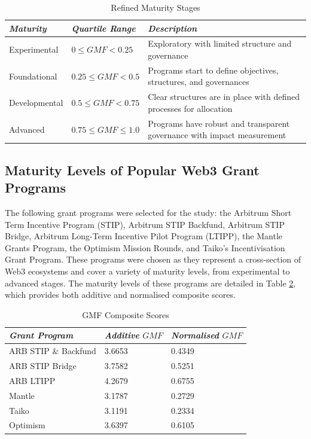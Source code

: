 \documentclass[conference]{IEEEtran}
\begin{document}
\begin{table}[htbp]
\caption{Refined Maturity Stages}
\begin{center}
\footnotesize
\begin{tabular}{p{1.5cm}p{2.5cm}p{3.5cm}}
\hline
\textbf{\textit{Maturity}} & \textbf{\textit{Quartile Range}} & \textbf{\textit{Description}} \\
\hline
Experimental & \( 0 \leq GMF < 0.25 \) & Exploratory with limited structure and governance \\
Foundational & \( 0.25 \leq GMF < 0.5 \) & Programs start to define objectives, structures, and governances \\
Developmental & \( 0.5 \leq GMF < 0.75 \) & Clear structures are in place with defined processes for allocation \\
Advanced & \( 0.75 \leq GMF \leq 1.0 \) & Programs have robust and transparent governance with impact measurement \\
\hline
\end{tabular}
\label{tab:maturity_stages}
\end{center}
\end{table}

\subsection{Maturity Levels of Popular Web3 Grant Programs}\label{sec_4.2}

The following grant programs were selected for the study: the Arbitrum Short Term Incentive Program (STIP), Arbitrum STIP Backfund, Arbitrum STIP Bridge, Arbitrum Long-Term Incentive Pilot Program (LTIPP), the Mantle Grants Program, the Optimism Mission Rounds, and Taiko's Incentivisation Grant Program. These programs were chosen as they represent a cross-section of Web3 ecosystems and cover a variety of maturity levels, from experimental to advanced stages. The maturity levels of these programs are detailed in Table \ref{tab:gmf_composite_score}, which provides both additive and normalised composite scores.

\begin{table}[htbp]
\caption{GMF Composite Scores}
\begin{center}
\footnotesize
\begin{tabular}{p{2.7cm}p{2cm}p{2.3cm}}
\hline
\textbf{\textit{Grant Program}} & \textbf{\textit{Additive} \( GMF\)} & \textbf{\textit{Normalised} \( GMF \)} \\
\hline
ARB STIP \& Backfund & 3.6653 & 0.4349 \\
ARB STIP Bridge & 3.7582 & 0.5251 \\
ARB LTIPP & 4.2679 & 0.6755 \\
Mantle & 3.1787 & 0.2729 \\
Taiko & 3.1191 & 0.2334 \\
Optimism & 3.6397 & 0.6105 \\
\hline
\end{tabular}
\end{center}
\label{tab:gmf_composite_score}
\end{table}
\end{document}
